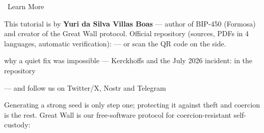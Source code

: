 \documentclass[10pt]{article}
\begin{document}
\begin{infobox}{\faInfoCircle~Learn More}
\begin{minipage}[c]{0.8\textwidth}
This tutorial is by \textbf{Yuri da Silva Villas Boas} --- author of BIP-450 (Formosa) and creator of the Great Wall protocol. Official repository (sources, PDFs in 4 languages, automatic verification): \repolink --- or scan the QR code on the side.

\begin{description}[itemsep=1pt]
 \item [Short paper:] why a quiet fix was impossible --- Kerckhoffs and the July 2026 incident: \paperlink in the repository
 \item [More tutorials, courses and community:] \sitelink --- and follow us on Twitter/X, Nostr and Telegram
 \item [Great Wall:] Generating a strong seed is only step one; protecting it against theft and coercion is the rest. Great Wall is our free-software protocol for coercion-resistant self-custody: \gwlink
\end{description}

\end{minipage}%
\hfill
\begin{minipage}[c]{0.15\textwidth}
\centering
\repoqr
\end{minipage}
\end{infobox}

\end{document}
